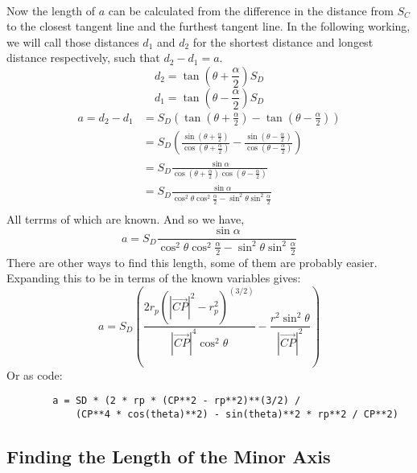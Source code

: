\documentclass{article}
\newcommand\cpv{\overrightarrow{CP}\xspace}
\begin{document}
	\paragraph{}
	Now the length of $a$ can be calculated from the difference in the distance from $S_C$ to the closest tangent line and the furthest tangent 	line. In the following working, we will call those distances $d_1$ and $d_2$ for the shortest distance and longest distance respectively, 
	such that $d_2 - d_1 = a$.
	$$  d_2 =  \tan{\left(\theta + \frac{\alpha}{2}\right)} S_D $$
	$$  d_1 =  \tan{\left(\theta - \frac{\alpha}{2}\right)} S_D $$
	\begin{align*}
		a = d_2 - d_1 & = S_D \left(\tan{\left(\theta + \frac{\alpha}{2}\right)} - \tan{\left(\theta - \frac{\alpha}{2}\right)} \right) \\
		& = S_D\left(\frac{\sin{\left(\theta + \frac{\alpha}{2}\right)}}{\cos{\left(\theta + \frac{\alpha}{2}\right)}} 
				    - \frac{\sin{\left(\theta - \frac{\alpha}{2}\right)}}{\cos{\left(\theta - \frac{\alpha}{2}\right)}}\right)    \\
		& = S_D \frac{\sin{\alpha}}{\cos{\left(\theta + \frac{\alpha}{2}\right)} \cos{\left(\theta - \frac{\alpha}{2}\right)}} \\
		& = S_D \frac{\sin{\alpha}}{\cos^2{\theta} \cos^2{\frac{\alpha}{2}} - \sin^2{\theta} \sin^2{\frac{\alpha}{2}}} \\
	\end{align*}
	All terrms of which are known. And so we have,
	\begin{equation}
		a =  S_D \frac{\sin{\alpha}}{\cos^2{\theta} \cos^2{\frac{\alpha}{2}} - \sin^2{\theta} \sin^2{\frac{\alpha}{2}}}
	\end{equation}
	There are other ways to find this length, some of them are probably easier. Expanding this to be in terms of the known variables gives:
	\begin{equation*}
		a = S_D  \left(\frac{2 r_p \left(\left|\cpv\right|^2-r_p^2\right)^{(3/2)}}{\left|\cpv\right|^4  \cos^2{\theta}}- 	
		\frac{r^2 \sin^2{\theta}}{\left|\cpv\right|^2}\right)
	\end{equation*}
	Or as code:
	\begin{verbatim}
		a = SD * (2 * rp * (CP**2 - rp**2)**(3/2) / 
		    (CP**4 * cos(theta)**2) - sin(theta)**2 * rp**2 / CP**2)
	\end{verbatim}

	\subsection{Finding the Length of the Minor Axis}
\end{document}
